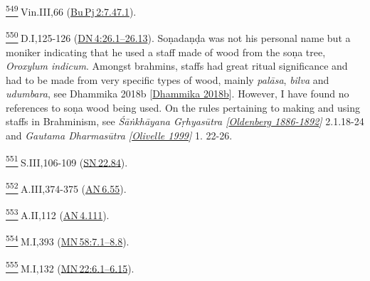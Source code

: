 \label{footprints_split_025.html_fn549}
\hyperref[footprints_split_014.htmlux5cux23fnref549]{\textsuperscript{549}} Vin.III,66
(\href{https://suttacentral.net/pli-tv-bu-vb-pj2/en/brahmali\#7.47.1}{Bu\,Pj\,2:7.47.1}).

\label{footprints_split_025.html_fn550}
\hyperref[footprints_split_014.htmlux5cux23fnref550]{\textsuperscript{550}} D.I,125-126
(\href{https://suttacentral.net/dn4/en/sujato\#26.1}{DN\,4:26.1--26.13}).
Soṇadaṇḍa was not his personal name but a moniker indicating that he
used a staff made of wood from the soṇa tree, \emph{Oroxylum indicum}.
Amongst brahmins, staffs had great ritual significance and had to be
made from very specific types of wood, mainly \emph{palāsa},
\emph{bilva} and \emph{udumbara}, see {Dhammika 2018b
{{[}\hyperref[footprints_split_022.htmlux5cux23Dhammikaux5cux25202018b]{Dhammika
2018b}{]}}}. However, I have found no references to soṇa wood being
used. On the rules pertaining to making and using staffs in Brahminism,
see \emph{{Śāṅkhāyana Gṛhyasūtra
{{[}\hyperref[footprints_split_022.htmlux5cux23Oldenbergux5cux25201886-1892]{Oldenberg
1886-1892}{]}}}} 2.1.18-24 and \emph{{Gautama Dharmasūtra
{{[}\hyperref[footprints_split_022.htmlux5cux23Olivelleux5cux25201999]{Olivelle
1999}{]}}}} 1. 22-26.

\label{footprints_split_025.html_fn551}
\hyperref[footprints_split_014.htmlux5cux23fnref551]{\textsuperscript{551}} S.III,106-109
(\href{https://suttacentral.net/sn22.84/en/sujato}{SN\,22.84}).

\label{footprints_split_025.html_fn552}
\hyperref[footprints_split_014.htmlux5cux23fnref552]{\textsuperscript{552}} A.III,374-375
(\href{https://suttacentral.net/an6.55/en/sujato}{AN\,6.55}).

\label{footprints_split_025.html_fn553}
\hyperref[footprints_split_014.htmlux5cux23fnref553]{\textsuperscript{553}} A.II,112
(\href{https://suttacentral.net/an4.111/en/sujato}{AN\,4.111}).

\label{footprints_split_025.html_fn554}
\hyperref[footprints_split_014.htmlux5cux23fnref554]{\textsuperscript{554}} M.I,393
(\href{https://suttacentral.net/mn58/en/sujato\#7.1}{MN\,58:7.1--8.8}).

\label{footprints_split_025.html_fn555}
\hyperref[footprints_split_014.htmlux5cux23fnref555]{\textsuperscript{555}} M.I,132
(\href{https://suttacentral.net/mn22/en/sujato\#6.1}{MN\,22:6.1--6.15}).

